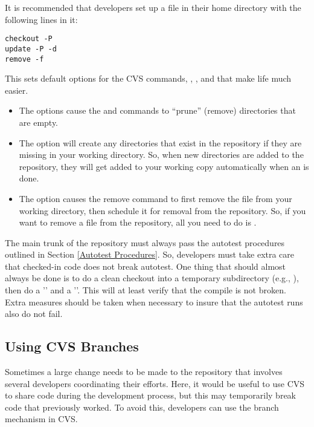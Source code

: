 It is recommended that developers set up a  file in their
home directory with the following lines in it:
\begin{verbatim}
checkout -P
update -P -d
remove -f
\end{verbatim}
This sets default options for the CVS commands, ,
, and  that make life much easier.
\begin{itemize}
\item The  options cause the  and 
commands to ``prune'' (remove) directories that are empty.

\item The  option will create any directories that exist in the
repository if they are missing in your working directory.  So, when
new directories are added to the repository, they will get added to
your working copy automatically when an  is done.

\item The  option causes the remove command to first remove the
file from your working directory, then schedule it for removal from
the repository.  So, if you want to remove a file from the repository,
all you need to do is .
\end{itemize}

The main trunk of the repository must always pass the autotest
procedures outlined in Section \ref{Autotest Procedures}.  So,
developers must take extra care that checked-in code does not break
autotest.  One thing that should almost always be done is to do a
clean checkout into a temporary subdirectory (e.g., ),
then do a '' and a ''.  This will at
least verify that the compile is not broken.  Extra measures should be
taken when necessary to insure that the autotest runs also do not
fail.

\subsection{Using CVS Branches}
\label{Using CVS Branches}

Sometimes a large change needs to be made to the repository that
involves several developers coordinating their efforts.  Here, it
would be useful to use CVS to share code during the development
process, but this may temporarily break code that previously worked.
To avoid this, developers can use the branch mechanism in CVS.

